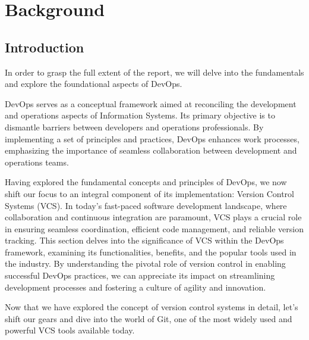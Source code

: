 \chapter*{Background}

\section*{Introduction}
In order to grasp the full extent of the report, we will delve into the fundamentals and explore the foundational aspects of DevOps.

DevOps serves as a conceptual framework aimed at reconciling the development and operations aspects of Information Systems. Its primary objective is to dismantle barriers between developers and operations professionals. By implementing a set of principles and practices, DevOps enhances work processes, emphasizing the importance of seamless collaboration between development and operations teams.\cite{diel2016communication}

Having explored the fundamental concepts and principles of DevOps, we now shift our focus to an integral component of its implementation: Version Control Systems (VCS). In today's fast-paced software development landscape, where collaboration and continuous integration are paramount, VCS plays a crucial role in ensuring seamless coordination, efficient code management, and reliable version tracking. This section delves into the significance of VCS within the DevOps framework, examining its functionalities, benefits, and the popular tools used in the industry. By understanding the pivotal role of version control in enabling successful DevOps practices, we can appreciate its impact on streamlining development processes and fostering a culture of agility and innovation.



Now that we have explored the concept of version control systems in detail, let's shift our gears and dive into the world of Git, one of the most widely used and powerful VCS tools available today.



